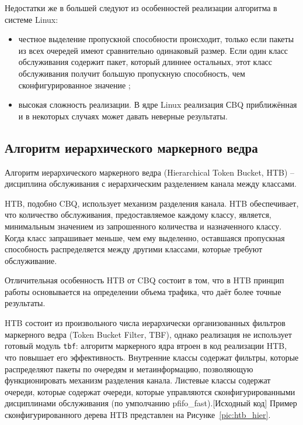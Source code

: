         Недостатки же в большей следуют из особенностей реализации алгоритма в системе Linux:
        \begin{itemize}
            \item честное выделение пропускной способности происходит, только если
                  пакеты из всех очередей имеют сравнительно одинаковый размер. Если один класс
                  обслуживания содержит пакет, который длиннее остальных, этот класс обслуживания
                  получит большую пропускную способность, чем сконфигурированное значение \cite{packethandling};

            \item высокая сложность реализации. В ядре Linux реализация СBQ приближённая и
                  в некоторых случаях может давать неверные результаты.\cite{lartc}
        \end{itemize}

    \subsection{Алгоритм иерархического маркерного ведра}

        Алгоритм иерархического маркерного ведра (Hierarchical Token Bucket, HTB) -- дисциплина
        обслуживания с иерархическим разделением канала между классами.

		HTB, подобно CBQ, использует механизм разделения канала. 
		HTB обеспечивает, что количество обслуживания, предоставляемое каждому классу, является,
		минимальным значением из запрошенного количества и назначенного классу. Когда класс
		запрашивает меньше, чем ему выделенно, оставшаяся пропускная способность распределяется между
		другими классами, которые требуют обслуживание.\cite{htb}

		Отличительная особенность HTB от CBQ состоит в том, что в HTB принцип работы
		основывается на определении объема трафика\cite{lartc}, что даёт более точные результаты.

		HTB состоит из произвольного числа иерархически организованных фильтров маркерного
        ведра (Token Bucket Filter, TBF)\cite{packethandling}, однако реализация не использует готовый
		модуль \texttt{tbf}: алгоритм маркерного ядра втроен в код реализации HTB,	
		что повышает его эффективность. Внутренние классы содержат фильтры, которые
		распределяют пакеты по очередям и метаинформацию, позволяющую функционировать
		механизм разделения канала. Листевые классы содержат очереди, которые содержат
		очереди, которые управляются сконфигурированными дисциплинами обслуживания (по
		умполчанию pfifo\_fast).[Исходный код] Пример сконфигурированного дерева HTB
		представлен на Рисунке~\ref{pic:htb_hier}.
		
